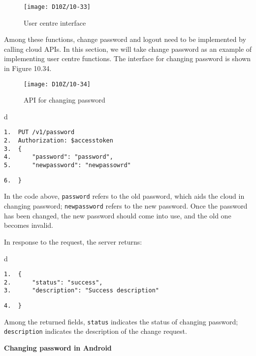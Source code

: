 \documentclass[a4paper,12pt]{book}
\begin{document}
\begin{figure}[ht]
    \centering
    \texttt{[image: D10Z/10-33]}
    \caption{User centre interface}
\end{figure}

Among these functions, change password and logout need to be implemented by calling cloud APIs. In this section, we will take change password as an example of implementing user centre functions. The interface for changing password is shown in Figure 10.34.

\begin{figure}[ht]
    \centering
    \texttt{[image: D10Z/10-34]}
    \caption{API for changing password}
\end{figure}

\begin{codebloc}
\begin{tabular}{d}
\vspace{2pt}
\begin{verbatim}
1.  PUT /v1/password
2.  Authorization: $accesstoken
3.  {
4.      "password": "password",
5.      "newpassword": "newpassowrd"
\end{verbatim}
\verb|6.  }|
\end{tabular}
\end{codebloc}

In the code above, \verb|password| refers to the old password, which aids the cloud in changing password; \verb|newpassword| refers to the new password. Once the password has been changed, the new password should come into use, and the old one becomes invalid.

In response to the request, the server returns:

\begin{codebloc}
\begin{tabular}{d}
\vspace{2pt}
\begin{verbatim}
1.  {
2.      "status": "success",
3.      "description": "Success description"
\end{verbatim}
\verb|4.  }|
\end{tabular}
\end{codebloc}

Among the returned fields, \verb|status| indicates the status of changing password; \verb|descrip|\newline \verb|tion| indicates the description of the change request.

\textbf{Changing password in Android}
\end{document}
